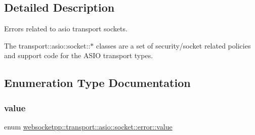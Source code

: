 \subsection{Detailed Description}
Errors related to asio transport sockets. 

The transport\+::asio\+::socket\+:\+:$\ast$ classes are a set of security/socket related policies and support code for the A\+S\+IO transport types. 

\subsection{Enumeration Type Documentation}
\mbox{\label{namespacewebsocketpp_1_1transport_1_1asio_1_1socket_1_1error_a828ddaa5ed63a761e1b557465a35f05a}} 
\subsubsection{\texorpdfstring{value}{value}}
{\footnotesize\ttfamily enum \mbox{\hyperlink{namespacewebsocketpp_1_1transport_1_1asio_1_1socket_1_1error_a828ddaa5ed63a761e1b557465a35f05a}{websocketpp\+::transport\+::asio\+::socket\+::error\+::value}}}

